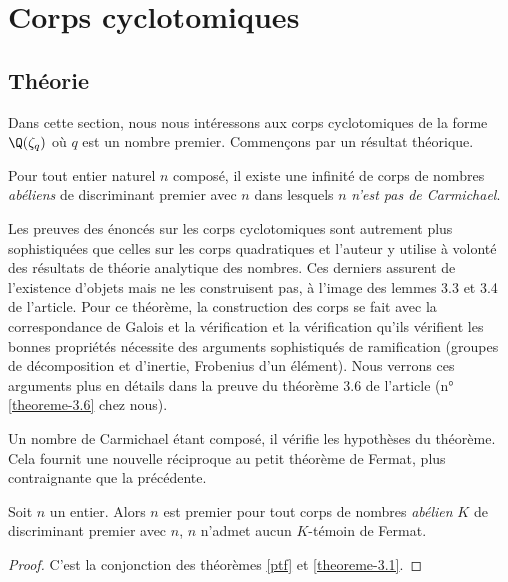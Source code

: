 \section{Corps cyclotomiques}

\subsection{Théorie}

Dans cette section, nous nous intéressons aux corps cyclotomiques de la forme $\Q(\zeta_q)$ où $q$ est un nombre premier. Commençons par un résultat théorique.

\begin{theoreme}\label{ptf}
	Pour tout entier naturel $n$ composé, il existe une infinité de corps de nombres \emph{abéliens} de discriminant premier avec $n$ dans lesquels $n$ \emph{n'est pas de Carmichael}.
\end{theoreme}

\begin{MotSurPreuve}
	Les preuves des énoncés sur les corps cyclotomiques sont autrement plus sophistiquées que celles sur les corps quadratiques et l'auteur y utilise à volonté des résultats de théorie analytique des nombres. Ces derniers assurent de l'existence d'objets mais ne les construisent pas, à l'image des lemmes 3.3 et 3.4 de l'article. Pour ce théorème, la construction des corps se fait avec la correspondance de Galois et la vérification et la vérification qu'ils vérifient les bonnes propriétés nécessite des arguments sophistiqués de ramification (groupes de décomposition et d'inertie, Frobenius d'un élément). Nous verrons ces arguments plus en détails dans la preuve du théorème 3.6 de l'article (n°\ref{theoreme-3.6} chez nous). \\
\end{MotSurPreuve}

Un nombre de Carmichael étant composé, il vérifie les hypothèses du théorème. Cela fournit une nouvelle réciproque au petit théorème de Fermat, plus contraignante que la précédente.

\begin{theoreme}
	Soit $n$ un entier. Alors $n$ est premier \ssi pour tout corps de nombres \emph{abélien} $K$ de discriminant premier avec $n$, $n$ n'admet aucun $K$-témoin de Fermat.
\end{theoreme}

\begin{proof}
	C'est la conjonction des théorèmes \ref{ptf} et \ref{theoreme-3.1}.
\end{proof}

